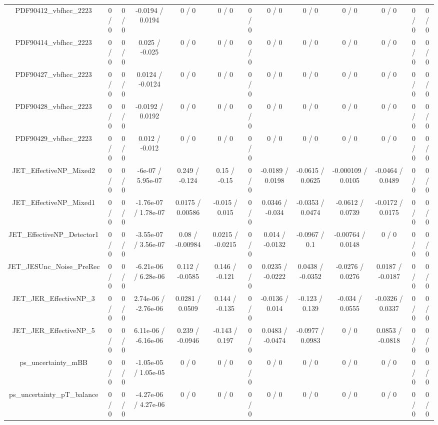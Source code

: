 \documentclass[10pt]{article}
\begin{document}
\begin{table}[htbp]
\begin{center}
\begin{tabular}{|c|c|c|c|c|c|c|c|c|c|c|c|c|}
  PDF90412_vbfhcc_2223 & 0 / 0 & 0 / 0 & -0.0194 / 0.0194 & 0 / 0 & 0 / 0 & 0 / 0 & 0 / 0 & 0 / 0 & 0 / 0 & 0 / 0 & 0 / 0 & 0 / 0 \\ 
  PDF90414_vbfhcc_2223 & 0 / 0 & 0 / 0 & 0.025 / -0.025 & 0 / 0 & 0 / 0 & 0 / 0 & 0 / 0 & 0 / 0 & 0 / 0 & 0 / 0 & 0 / 0 & 0 / 0 \\ 
  PDF90427_vbfhcc_2223 & 0 / 0 & 0 / 0 & 0.0124 / -0.0124 & 0 / 0 & 0 / 0 & 0 / 0 & 0 / 0 & 0 / 0 & 0 / 0 & 0 / 0 & 0 / 0 & 0 / 0 \\ 
  PDF90428_vbfhcc_2223 & 0 / 0 & 0 / 0 & -0.0192 / 0.0192 & 0 / 0 & 0 / 0 & 0 / 0 & 0 / 0 & 0 / 0 & 0 / 0 & 0 / 0 & 0 / 0 & 0 / 0 \\ 
  PDF90429_vbfhcc_2223 & 0 / 0 & 0 / 0 & 0.012 / -0.012 & 0 / 0 & 0 / 0 & 0 / 0 & 0 / 0 & 0 / 0 & 0 / 0 & 0 / 0 & 0 / 0 & 0 / 0 \\ 
  JET_EffectiveNP_Mixed2 & 0 / 0 & 0 / 0 & -6e-07 / 5.95e-07 & 0.249 / -0.124 & 0.15 / -0.15 & 0 / 0 & -0.0189 / 0.0198 & -0.0615 / 0.0625 & -0.000109 / 0.0105 & -0.0464 / 0.0489 & 0 / 0 & 0 / 0 \\ 
  JET_EffectiveNP_Mixed1 & 0 / 0 & 0 / 0 & -1.76e-07 / 1.78e-07 & 0.0175 / 0.00586 & -0.015 / 0.015 & 0 / 0 & 0.0346 / -0.034 & -0.0353 / 0.0474 & -0.0612 / 0.0739 & -0.0172 / 0.0175 & 0 / 0 & 0 / 0 \\ 
  JET_EffectiveNP_Detector1 & 0 / 0 & 0 / 0 & -3.55e-07 / 3.56e-07 & 0.08 / -0.00984 & 0.0215 / -0.0215 & 0 / 0 & 0.014 / -0.0132 & -0.0967 / 0.1 & -0.00764 / 0.0148 & 0 / 0 & 0 / 0 & 0 / 0 \\ 
  JET_JESUnc_Noise_PreRec & 0 / 0 & 0 / 0 & -6.21e-06 / 6.28e-06 & 0.112 / -0.0585 & 0.146 / -0.121 & 0 / 0 & 0.0235 / -0.0222 & 0.0438 / -0.0352 & -0.0276 / 0.0276 & 0.0187 / -0.0187 & 0 / 0 & 0 / 0 \\ 
  JET_JER_EffectiveNP_3 & 0 / 0 & 0 / 0 & 2.74e-06 / -2.76e-06 & 0.0281 / 0.0509 & 0.144 / -0.135 & 0 / 0 & -0.0136 / 0.014 & -0.123 / 0.139 & -0.034 / 0.0555 & -0.0326 / 0.0337 & 0 / 0 & 0 / 0 \\ 
  JET_JER_EffectiveNP_5 & 0 / 0 & 0 / 0 & 6.11e-06 / -6.16e-06 & 0.239 / -0.0946 & -0.143 / 0.197 & 0 / 0 & 0.0483 / -0.0474 & -0.0977 / 0.0983 & 0 / 0 & 0.0853 / -0.0818 & 0 / 0 & 0 / 0 \\ 
  ps_uncertainty_mBB & 0 / 0 & 0 / 0 & -1.05e-05 / 1.05e-05 & 0 / 0 & 0 / 0 & 0 / 0 & 0 / 0 & 0 / 0 & 0 / 0 & 0 / 0 & 0 / 0 & 0 / 0 \\ 
  ps_uncertainty_pT_balance & 0 / 0 & 0 / 0 & -4.27e-06 / 4.27e-06 & 0 / 0 & 0 / 0 & 0 / 0 & 0 / 0 & 0 / 0 & 0 / 0 & 0 / 0 & 0 / 0 & 0 / 0 \\ 

\end{tabular}
\end{center}
\end{table}
\end{document}
